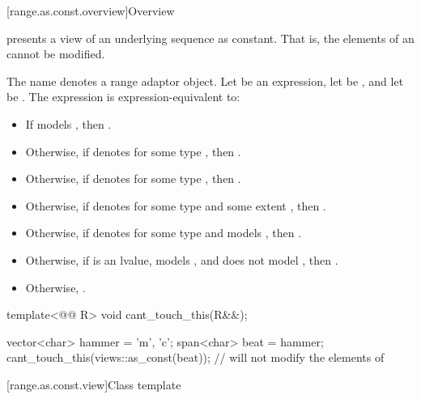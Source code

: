 [range.as.const.overview]{Overview}

\pnum
{} presents a view of an underlying sequence as constant.
That is, the elements of an  cannot be modified.

\pnum
The name  denotes
a range adaptor object.
Let  be an expression,
let  be , and
let  be .
The expression  is expression-equivalent to:
\begin{itemize}
\item
If  models ,
then .
\item
Otherwise,
if  denotes 
for some type , then .
\item
Otherwise, if  denotes 
for some type , then .
\item
Otherwise,
if  denotes 
for some type  and some extent ,
then .
\item
Otherwise,
if  denotes  for some type  and
 models ,
then .
\item
Otherwise,
if  is an lvalue,
 models , and
 does not model ,
then .
\item
Otherwise, .
\end{itemize}

\pnum
\begin{example}
\begin{codeblock}
template<@@ R>
void cant_touch_this(R&&);

vector<char> hammer = {'m', 'c'};
span<char> beat = hammer;
cant_touch_this(views::as_const(beat));         // will not modify the elements of 
\end{codeblock}
\end{example}

[range.as.const.view]{Class template }

